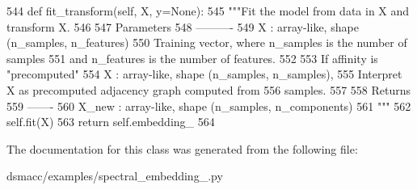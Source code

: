 \begin{DoxyCode}
544     \textcolor{keyword}{def }fit\_transform(self, X, y=None):
545         \textcolor{stringliteral}{"""Fit the model from data in X and transform X.}
546 \textcolor{stringliteral}{}
547 \textcolor{stringliteral}{        Parameters}
548 \textcolor{stringliteral}{        ----------}
549 \textcolor{stringliteral}{        X : array-like, shape (n\_samples, n\_features)}
550 \textcolor{stringliteral}{            Training vector, where n\_samples is the number of samples}
551 \textcolor{stringliteral}{            and n\_features is the number of features.}
552 \textcolor{stringliteral}{}
553 \textcolor{stringliteral}{            If affinity is "precomputed"}
554 \textcolor{stringliteral}{            X : array-like, shape (n\_samples, n\_samples),}
555 \textcolor{stringliteral}{            Interpret X as precomputed adjacency graph computed from}
556 \textcolor{stringliteral}{            samples.}
557 \textcolor{stringliteral}{}
558 \textcolor{stringliteral}{        Returns}
559 \textcolor{stringliteral}{        -------}
560 \textcolor{stringliteral}{        X\_new : array-like, shape (n\_samples, n\_components)}
561 \textcolor{stringliteral}{        """}
562         self.fit(X)
563         \textcolor{keywordflow}{return} self.embedding\_
564 \end{DoxyCode}


The documentation for this class was generated from the following file\+:\begin{DoxyCompactItemize}
\item 
dsmacc/examples/spectral\+\_\+embedding\+\_\+.\+py\end{DoxyCompactItemize}
